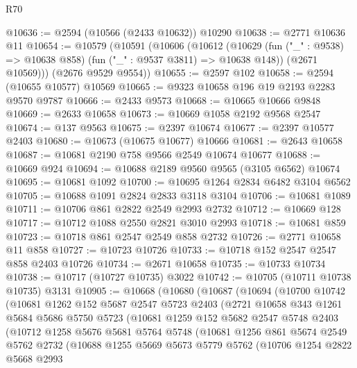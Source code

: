 \begin{lexlean}{R70}
\begin{coremodule}
@10636 := @2594 (@10566 (@2433 @10632)) @10290
@10638 := @2771 @10636 @11
@10654 := @10579
    (@10591
      (@10606
        (@10612
          (@10629 (fun ("_" : @9538) => @10638 @858) (fun ("_" : @9537 @3811) => @10638 @148))
          (@2671 @10569)))
      (@2676 @9529 @9554))
@10655 := @2597 @102
@10658 := @2594 (@10655 @10577) @10569
@10665 := @9323 @10658 @196 @19 @2193 @2283 @9570 @9787
@10666 := @2433 @9573
@10668 := @10665 @10666 @9848
@10669 := @2633 @10658
@10673 := @10669 @1058 @2192 @9568 @2547
@10674 := @137 @9563
@10675 := @2397 @10674
@10677 := @2397 @10577 @2403
@10680 := @10673 (@10675 @10677) @10666
@10681 := @2643 @10658
@10687 := @10681 @2190 @758 @9566 @2549 @10674 @10677
@10688 := @10669 @924
@10694 := @10688 @2189 @9560 @9565 (@3105 @6562) @10674
@10695 := @10681 @1092
@10700 := @10695 @1264 @2834 @6482 @3104 @6562
@10705 := @10688 @1091 @2824 @2833 @3118 @3104
@10706 := @10681 @1089
@10711 := @10706 @861 @2822 @2549 @2993 @2732
@10712 := @10669 @128
@10717 := @10712 @1088 @2550 @2821 @3010 @2993
@10718 := @10681 @859
@10723 := @10718 @861 @2547 @2549 @858 @2732
@10726 := @2771 @10658 @11 @858
@10727 := @10723 @10726
@10733 := @10718 @152 @2547 @2547 @858 @2403 @10726
@10734 := @2671 @10658
@10735 := @10733 @10734
@10738 := @10717 (@10727 @10735) @3022
@10742 := @10705 (@10711 @10738 @10735) @3131
@10905 := @10668
    (@10680
      (@10687
        (@10694
          (@10700
            @10742
            (@10681
              @1262
              @152
              @5687
              @2547
              @5723
              @2403
              (@2721
                @10658
                @343
                @1261
                @5684
                @5686
                @5750
                @5723
                (@10681
                  @1259
                  @152
                  @5682
                  @2547
                  @5748
                  @2403
                  (@10712
                    @1258
                    @5676
                    @5681
                    @5764
                    @5748
                    (@10681
                      @1256
                      @861
                      @5674
                      @2549
                      @5762
                      @2732
                      (@10688
                        @1255
                        @5669
                        @5673
                        @5779
                        @5762
                        (@10706
                          @1254
                          @2822
                          @5668
                          @2993

\end{coremodule}
\end{lexlean}
